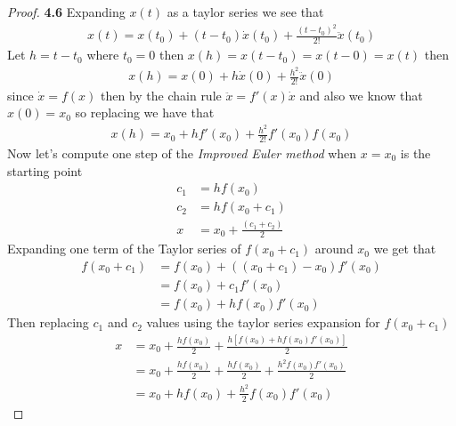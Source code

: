 \documentclass[11pt]{article}
\begin{document}
    \begin{proof}{\textbf{4.6}}
        Expanding $x(t)$ as a taylor series we see that
        \begin{align*}
            x(t) = x(t_0) + (t - t_0)\dot{x}(t_0) +\frac{(t - t_0)^2}{2!}\ddot{x}(t_0)
        \end{align*}
        Let $h = t - t_0$ where $t_0 = 0$ then $x(h) = x(t-t_0) = x(t - 0) = x(t)$ then 
        \begin{align*}
            x(h) = x(0) + h\dot{x}(0) +\frac{h^2}{2!}\ddot{x}(0)      
        \end{align*}
        since $\dot{x} = f(x)$ then by the chain rule $\ddot{x}=f'(x)\dot{x}$
        and also we know that $x(0)=x_0$ so replacing we have that 
        \begin{align*}
            x(h) = x_0 + hf'(x_0) +\frac{h^2}{2!}f'(x_0)f(x_0)      
        \end{align*}
        Now let's compute one step of the \textit{Improved Euler method} when
        $x=x_0$ is the starting point
        \begin{align*}
            c_1 &= hf(x_0)\\
            c_2 &= hf(x_0+c_1)\\
            x &= x_0 + \frac{(c_1 + c_2)}{2}
        \end{align*}
        Expanding one term of the Taylor series of $f(x_0 + c_1)$ around $x_0$
        we get that 
        \begin{align*}
            f(x_0 + c_1) &= f(x_0) + ((x_0 + c_1) - x_0)f'(x_0)\\
                         &= f(x_0) + c_1f'(x_0)\\
                         &= f(x_0) + hf(x_0)f'(x_0)
        \end{align*}
        Then replacing $c_1$ and $c_2$ values using the taylor series expansion
        for $f(x_0 + c_1)$
        \begin{align*}
            x &= x_0 + \frac{hf(x_0)}{2} + \frac{h[f(x_0) + hf(x_0)f'(x_0)]}{2}\\
              &= x_0 + \frac{hf(x_0)}{2} + \frac{hf(x_0)}{2} + \frac{h^2f(x_0)f'(x_0)}{2}\\
              &= x_0 + hf(x_0) + \frac{h^2}{2}f(x_0)f'(x_0)
        \end{align*}

    \end{proof}
\end{document}

